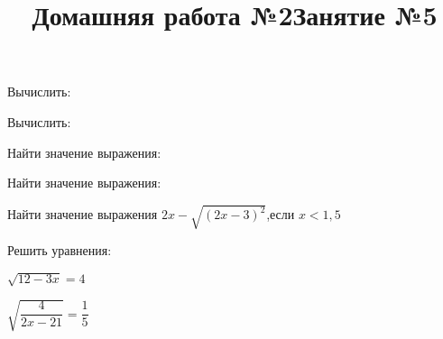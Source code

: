 \newpage
\title{Домашняя работа №2}
\begin{listofex}
	\item Вычислить:
	\begin{enumcols}[itemcolumns=2]
		\item {}
		\item {}
		\item {}
		\item {}
	\end{enumcols}
	\item Вычислить:
	\begin{enumcols}[itemcolumns=2]
		\item {}
		\item {}
	\end{enumcols}
	\item Найти значение выражения:
	\begin{enumcols}[itemcolumns=2]
		\item {}
		\item {}
	\end{enumcols}
	\item {}
	\item Найти значение выражения:
	\begin{enumcols}[itemcolumns=2]
		\item {}
		\item {}
	\end{enumcols}
	\item {}
	\item Найти значение выражения \( 2x-\sqrt{(2x-3)^2} \),\quad если \( x<1,5\)
	\item Решить уравнения:
	\begin{enumcols}[itemcolumns=2]
		\item {}
		\item \( \sqrt{12-3x}=4 \)
		\item \( \sqrt{\dfrac{4}{2x-21}}=\dfrac{1}{5} \)
		\item {}
	\end{enumcols}
\end{listofex}
\newpage
\title{Занятие №5}
